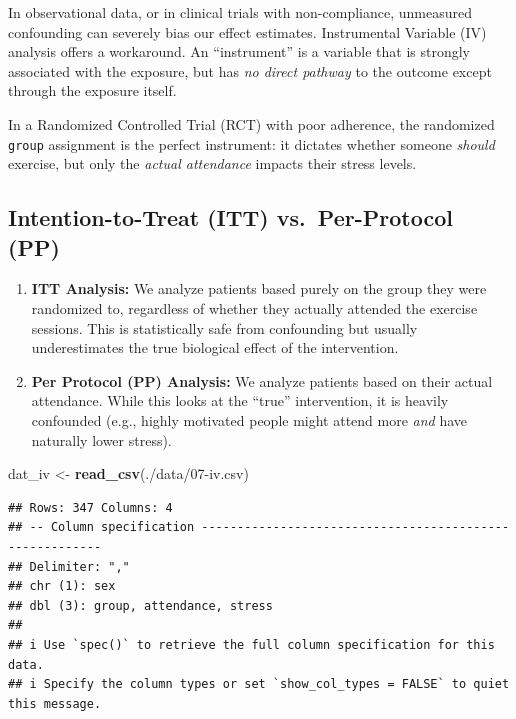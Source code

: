 \documentclass[
]{book}
\newenvironment{Shaded}{\begin{snugshade}}{\end{snugshade}}
\newcommand{\FunctionTok}[1]{\textcolor[rgb]{0.13,0.29,0.53}{\textbf{#1}}}
\newcommand{\NormalTok}[1]{#1}
\newcommand{\OtherTok}[1]{\textcolor[rgb]{0.56,0.35,0.01}{#1}}
\newcommand{\StringTok}[1]{\textcolor[rgb]{0.31,0.60,0.02}{#1}}
\providecommand{\tightlist}{%
  \setlength{\itemsep}{0pt}\setlength{\parskip}{0pt}}
\begin{document}
In observational data, or in clinical trials with non-compliance, unmeasured confounding can severely bias our effect estimates. Instrumental Variable (IV) analysis offers a workaround. An ``instrument'' is a variable that is strongly associated with the exposure, but has \emph{no direct pathway} to the outcome except through the exposure itself.

In a Randomized Controlled Trial (RCT) with poor adherence, the randomized \texttt{group} assignment is the perfect instrument: it dictates whether someone \emph{should} exercise, but only the \emph{actual attendance} impacts their stress levels.

\subsection{Intention-to-Treat (ITT) vs.~Per-Protocol (PP)}\label{intention-to-treat-itt-vs.-per-protocol-pp}

\begin{enumerate}
\def\labelenumi{\arabic{enumi}.}
\tightlist
\item
  \textbf{ITT Analysis:} We analyze patients based purely on the group they were randomized to, regardless of whether they actually attended the exercise sessions. This is statistically safe from confounding but usually underestimates the true biological effect of the intervention.
\item
  \textbf{Per Protocol (PP) Analysis:} We analyze patients based on their actual attendance. While this looks at the ``true'' intervention, it is heavily confounded (e.g., highly motivated people might attend more \emph{and} have naturally lower stress).
\end{enumerate}

\begin{Shaded}
\begin{Highlighting}[]
\NormalTok{dat\_iv }\OtherTok{\textless{}{-}} \FunctionTok{read\_csv}\NormalTok{(}\StringTok{\textquotesingle{}./data/07{-}iv.csv\textquotesingle{}}\NormalTok{)}
\end{Highlighting}
\end{Shaded}

\begin{verbatim}
## Rows: 347 Columns: 4
## -- Column specification --------------------------------------------------------
## Delimiter: ","
## chr (1): sex
## dbl (3): group, attendance, stress
## 
## i Use `spec()` to retrieve the full column specification for this data.
## i Specify the column types or set `show_col_types = FALSE` to quiet this message.
\end{verbatim}
\end{document}
